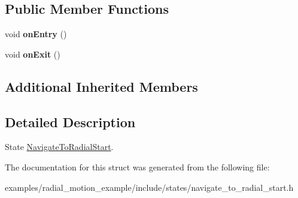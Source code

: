 \subsection*{Public Member Functions}
\begin{DoxyCompactItemize}
\item 
void {\bfseries on\+Entry} ()\hypertarget{structNavigateToRadialStart_1_1NavigateToRadialStart_a99d667686b14a7703ddad496c9082d10}{}\label{structNavigateToRadialStart_1_1NavigateToRadialStart_a99d667686b14a7703ddad496c9082d10}

\item 
void {\bfseries on\+Exit} ()\hypertarget{structNavigateToRadialStart_1_1NavigateToRadialStart_a6dbd559acd3df7fd07f660d75a9a487e}{}\label{structNavigateToRadialStart_1_1NavigateToRadialStart_a6dbd559acd3df7fd07f660d75a9a487e}

\end{DoxyCompactItemize}
\subsection*{Additional Inherited Members}


\subsection{Detailed Description}
State \hyperlink{structNavigateToRadialStart_1_1NavigateToRadialStart}{Navigate\+To\+Radial\+Start}. 

The documentation for this struct was generated from the following file\+:\begin{DoxyCompactItemize}
\item 
examples/radial\+\_\+motion\+\_\+example/include/states/navigate\+\_\+to\+\_\+radial\+\_\+start.\+h\end{DoxyCompactItemize}
